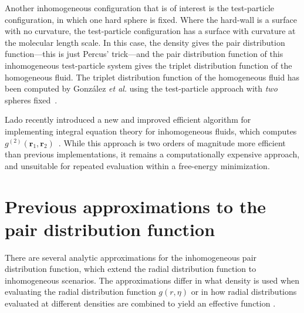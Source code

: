\documentclass[letterpaper,twocolumn,amsmath,amssymb,pre,aps,10pt]{revtex4-1}
\newcommand{\rr}{\textbf{r}}
\begin{document}
Another inhomogeneous configuration that is of interest is the
test-particle configuration, in which one hard sphere is fixed.  Where
the hard-wall is a surface with no curvature, the test-particle
configuration has a surface with curvature at the molecular length
scale.  In this case, the density gives the pair distribution
function---this is just Percus' trick---and the pair distribution
function of this inhomogeneous test-particle system gives the triplet
distribution function of the homogeneous fluid.  The triplet
distribution function of the homogeneous fluid has been computed by
Gonz\'alez \emph{et al.} using the test-particle approach with
\emph{two} spheres fixed~\cite{gonzalez1999test}.

Lado recently introduced a new and improved efficient algorithm for
implementing integral equation theory for inhomogeneous fluids, which
computes $g^{(2)}(\rr_1,\rr_2)$~\cite{lado2009efficient}.  While this
approach is two orders of magnitude more efficient than previous
implementations, it remains a computationally expensive approach, and
unsuitable for repeated evaluation within a free-energy minimization.

\section{Previous approximations to the pair distribution function}
There are several analytic approximations for the inhomogeneous pair
distribution function, which extend the radial distribution function
to inhomogeneous scenarios.  The approximations differ in what density
is used when evaluating the radial distribution function $g(r,\eta)$
or in how radial distributions evaluated at different densities are
combined to yield an effective function
\cite{toxvaerd1973statistical}.
\end{document}
